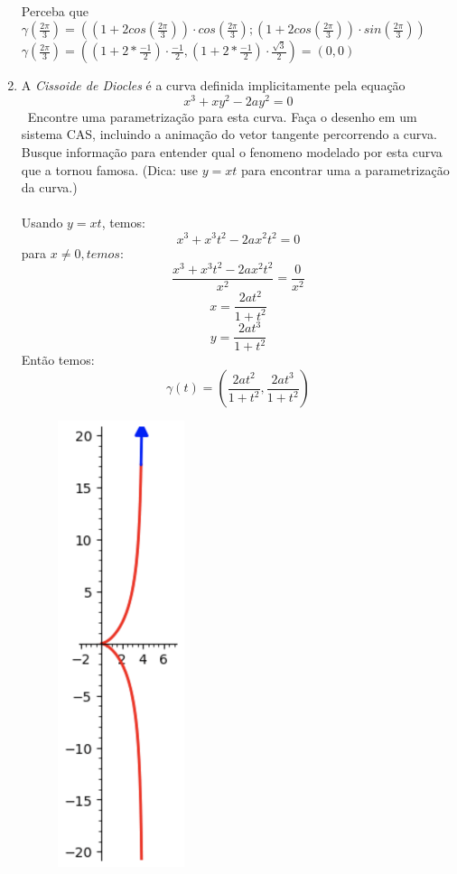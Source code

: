 \documentclass{article}
\begin{document}
\begin{enumerate}
\begin{figure}[!h]
        \end{figure}
        \\ Perceba que $\gamma(\frac{2\pi}{3}) = ((1+2cos(\frac{2\pi}{3})) \cdot cos(\frac{2\pi}{3}); (1+2cos(\frac{2\pi}{3})) \cdot sin(\frac{2\pi}{3})) $\\
        $\gamma(\frac{2\pi}{3}) = ((1+2*\frac{-1}{2})\cdot\frac{-1}{2}, (1+2*\frac{-1}{2})\cdot\frac{\sqrt{3}}{2}) = (0, 0) $ \\
    \item A \textit{Cissoide de Diocles} é a curva definida implicitamente pela equação \
        $$x^3+xy^2-2ay^2=0$$ \
        Encontre uma parametrização para esta curva. Faça o desenho em um sistema CAS, incluindo a animação do vetor tangente percorrendo a curva. Busque informação para entender qual o fenomeno modelado por esta curva que a tornou famosa. (Dica: use $y = xt$ para encontrar uma a parametrização da curva.) \\
        \\
        Usando $y = xt$, temos:
            $$ x^3 + x^3t^2 - 2ax^2t^2 = 0 $$
            para $x \neq 0, temos:$
            $$ \frac{x^3 + x^3t^2 - 2ax^2t^2}{x^2} = \frac{0}{x^2} $$
            $$ x = \frac{2at^2}{1+t^2} $$
            $$ y = \frac{2at^3}{1+t^2} $$
            Então temos:
            $$\gamma(t) = (\frac{2at^2}{1+t^2}, \frac{2at^3}{1+t^2})$$
            \begin{figure}[!h]
                \centering
                \includegraphics[width=0.35\textwidth]{imgs/cissoide_de_diocles.png}

\end{figure}
\end{enumerate}
\end{document}
